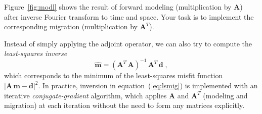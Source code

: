 \begin{enumerate}
Figure~\ref{fig:modl} shows the result of forward modeling
(multiplication by $\mathbf{A}$) after inverse Fourier transform to
time and space. Your task is to implement the corresponding migration
(multiplication by $\mathbf{A}^T$). 

Instead of simply applying the adjoint operator, we can also try to compute
the \emph{least-squares inverse}
\begin{equation}
\label{eq:lsmig}
\widehat{\mathbf{m}} = \left(\mathbf{A}^T\,\mathbf{A}\right)^{-1}\,\mathbf{A}^T\,\mathbf{d}\;,
\end{equation}
which corresponds to the minimum of the least-squares misfit function
$|\mathbf{A}\,\mathbf{m}-\mathbf{d}|^2$. In practice, inversion in
equation~(\ref{eq:lsmig}) is implemented with an
iterative \emph{conjugate-gradient} algorithm, which applies
$\mathbf{A}$ and $\mathbf{A}^T$ (modeling and migration) at each
iteration without the need to form any matrices explicitly.




\end{enumerate}
